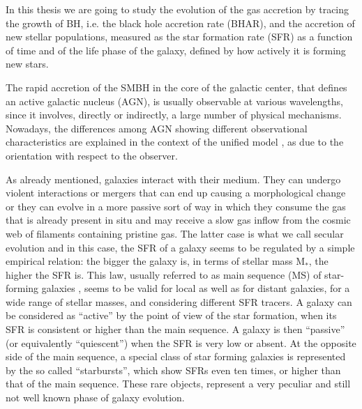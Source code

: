 In this thesis we are going to study the evolution of the gas accretion by tracing the growth of BH, i.e. the black hole accretion rate (BHAR), and the accretion of new stellar populations, measured as the star formation rate (SFR) as a function of time and of the life phase of the galaxy, defined by how actively it is forming new stars.

The rapid accretion of the SMBH in the core of the galactic center, that defines an active galactic nucleus (AGN), is usually observable at various wavelengths, since it involves, directly or indirectly, a large number of physical mechanisms. Nowadays, the differences among AGN showing different observational characteristics are explained in the context of the unified model \citep{1977ApJ...213..635R, 1984ApJ...278..499A, 1985ApJ...297..621A, 1993ARA&A..31..473A, 1995PASP..107..803U, 2015ARA&A..53..365N}, as due to the orientation with respect to the observer.

As already mentioned, galaxies interact with their medium. They can undergo violent interactions or mergers that can end up causing a morphological change or they can evolve in a more passive sort of way in which they consume the gas that is already present in situ and may receive a slow gas inflow from the cosmic web of filaments containing pristine gas. The latter case is what we call secular evolution and in this case, the SFR of a galaxy
seems to be regulated by a simple empirical relation: the bigger the galaxy is, in terms of stellar mass M$_*$, the higher the SFR is. This law, usually referred to as main sequence (MS) of star-forming galaxies \citep{2004MNRAS.351.1151B, 2007A&A...468...33E, 2007ApJ...670..156D, 2007ApJ...660L..47N, 2014MNRAS.443...19R, 2017MNRAS.465.3390A}, seems to be valid for local as well as for distant galaxies, for a wide range of stellar masses, and considering different SFR tracers. A galaxy can be considered as ``active'' by the point of view of the star formation, when its SFR is consistent or higher than the main sequence. A galaxy is then ``passive'' (or equivalently ``quiescent'') when the SFR is very low or absent. At the opposite side of the main sequence, a special class of star forming galaxies is represented by the so called ``starbursts'', which show SFRs even ten times, or higher than that of the main sequence. These rare objects, represent a very peculiar and still not well known phase of galaxy evolution. 

